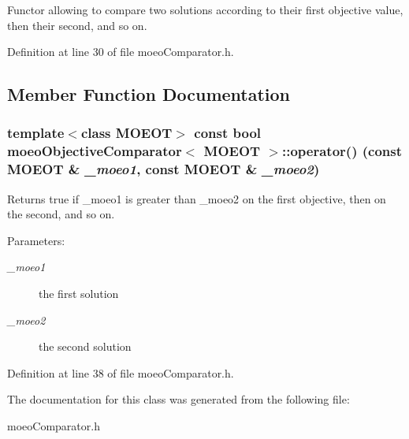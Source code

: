 Functor allowing to compare two solutions according to their first objective value, then their second, and so on. 



Definition at line 30 of file moeo\-Comparator.h.

\subsection{Member Function Documentation}
\subsubsection{\setlength{\rightskip}{0pt plus 5cm}template$<$class MOEOT$>$ const bool {\bf moeo\-Objective\-Comparator}$<$ MOEOT $>$::operator() (const MOEOT \& {\em \_\-moeo1}, const MOEOT \& {\em \_\-moeo2})\hspace{0.3cm}{\tt  [inline]}}\label{classmoeoObjectiveComparator_2de70cc9c5034f9594cc7695af57edaf}


Returns true if \_\-moeo1 is greater than \_\-moeo2 on the first objective, then on the second, and so on. 

\begin{Desc}
\item[Parameters:]
\begin{description}
\item[{\em \_\-moeo1}]the first solution \item[{\em \_\-moeo2}]the second solution \end{description}
\end{Desc}


Definition at line 38 of file moeo\-Comparator.h.

The documentation for this class was generated from the following file:\begin{CompactItemize}
\item 
moeo\-Comparator.h\end{CompactItemize}
